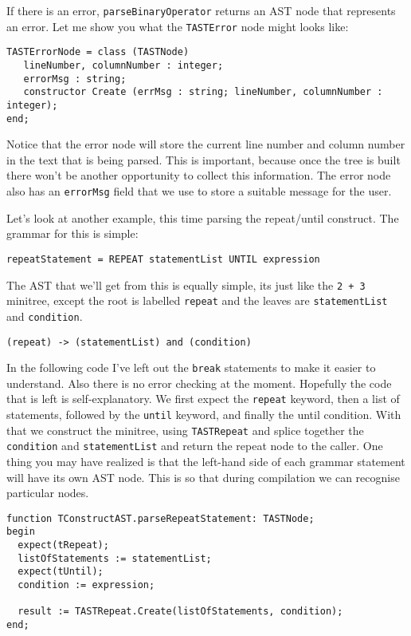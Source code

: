 If there is an error, {\tt parseBinaryOperator} returns an AST node that represents an error. Let me show you what the {\tt TASTError} node might looks like:

\begin{lstlisting}
TASTErrorNode = class (TASTNode)
   lineNumber, columnNumber : integer;
   errorMsg : string;
   constructor Create (errMsg : string; lineNumber, columnNumber : integer);
end;
\end{lstlisting}

Notice that the error node will store the current line number and column number in the text that is being parsed. This is important, because once the tree is built there won't be another opportunity to collect this information. The error node also has an {\tt errorMsg} field that we use to store a suitable message for the user.

Let's look at another example, this time parsing the repeat/until construct. The grammar for this is simple:

{\tt\small repeatStatement = REPEAT statementList UNTIL expression}

The AST that we'll get from this is equally simple, its just like the {\tt 2 + 3} minitree, except the root is labelled {\tt repeat} and the leaves are {\tt statementList} and {\tt condition}.

{\tt\small (repeat) -> (statementList) and (condition)}

In the following code I've left out the {\tt break} statements to make it easier to understand. Also there is no error checking at the moment. Hopefully the code that is left is self-explanatory. We first expect the {\tt repeat} keyword, then a list of statements, followed by the {\tt until} keyword, and finally the until condition. With that we construct the minitree, using {\tt TASTRepeat} and splice together the {\tt condition} and {\tt statementList} and return the repeat node to the caller. One thing you may have realized is that the left-hand side of each grammar statement will have its own AST node. This is so that during compilation we can recognise particular nodes.

\begin{lstlisting}
function TConstructAST.parseRepeatStatement: TASTNode;
begin
  expect(tRepeat);
  listOfStatements := statementList;
  expect(tUntil);
  condition := expression;

  result := TASTRepeat.Create(listOfStatements, condition);
end;
\end{lstlisting}

